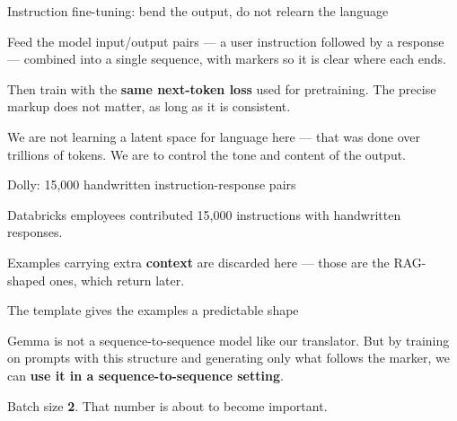 \documentclass[aspectratio=169,11pt,t]{beamer}
\begin{document}
\begin{frame}[shrink=25]{Instruction fine-tuning: bend the output, do not relearn the language}
{\fontsize{9.4}{12.6}\selectfont\color{fg2}Feed the model input/output pairs --- a user instruction followed by a response --- combined into a single sequence, with markers so it is clear where each ends.\par}\vskip 4pt
{\fontsize{9.4}{12.6}\selectfont\color{fg2}Then train with the \textbf{same next-token loss} used for pretraining. The precise markup does not matter, as long as it is consistent.\par}\vskip 4pt
\begin{iband}[signal]
We are not learning a latent space for language here --- that was done over trillions of tokens. We are  to control the tone and content of the output.
\end{iband}
\end{frame}

\begin{frame}[shrink=25]{Dolly: 15,000 handwritten instruction-response pairs}
{\fontsize{9.4}{12.6}\selectfont\color{fg2}Databricks employees contributed 15,000 instructions with handwritten responses.\par}\vskip 4pt
{\fontsize{9.4}{12.6}\selectfont\color{fg2}Examples carrying extra \textbf{context} are discarded here --- those are the RAG-shaped ones, which return later.\par}\vskip 4pt
\end{frame}

\begin{frame}[shrink=25]{The template gives the examples a predictable shape}
{\fontsize{9.4}{12.6}\selectfont\color{fg2}Gemma is not a sequence-to-sequence model like our translator. But by training on prompts with this structure and generating only what follows the \inlinecode{[response]} marker, we can \textbf{use it in a sequence-to-sequence setting}.\par}\vskip 4pt
{\fontsize{9.4}{12.6}\selectfont\color{fg2}Batch size \textbf{2}. That number is about to become important.\par}\vskip 4pt
\end{frame}
\end{document}
